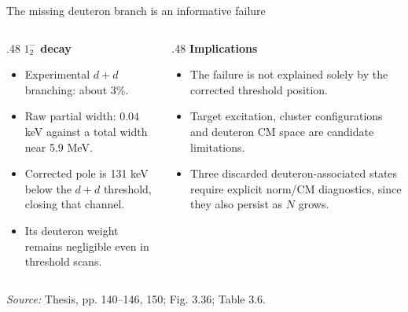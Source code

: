 \documentclass[aspectratio=169,11pt]{beamer}
\newcommand{\src}[1]{\par\vfill{\color{muted}\fontsize{7.5}{9}\selectfont\textit{Source:} #1\par}}
\begin{document}
\begin{frame}{The missing deuteron branch is an informative failure}
\begin{columns}[T]
\begin{column}{.48\textwidth}
\textbf{$1^-_2$ decay}
\begin{itemize}\setlength\itemsep{2mm}
\item Experimental $d+d$ branching: about 3\%.
\item Raw partial width: $0.04$ keV against a total width near 5.9 MeV.
\item Corrected pole is 131 keV below the $d+d$ threshold, closing that channel.
\item Its deuteron weight remains negligible even in threshold scans.
\end{itemize}
\end{column}
\begin{column}{.48\textwidth}
\textbf{Implications}
\begin{itemize}\setlength\itemsep{2mm}
\item The failure is not explained solely by the corrected threshold position.
\item Target excitation, cluster configurations and deuteron CM space are candidate limitations.
\item Three discarded deuteron-associated states require explicit norm/CM diagnostics, since they also persist as $N$ grows.
\end{itemize}
\end{column}
\end{columns}
\src{Thesis, pp. 140--146, 150; Fig. 3.36; Table 3.6.}
\end{frame}
\end{document}

